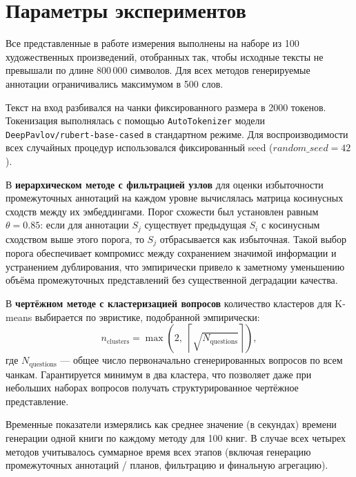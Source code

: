 \documentclass{article}
\theoremstyle{definition}
\theoremstyle{plain}
\begin{document}
\section*{Параметры экспериментов}

Все представленные в работе измерения выполнены на наборе из 100 художественных произведений, 
отобранных так, чтобы исходные тексты не превышали по длине 800\,000 символов. 
Для всех методов генерируемые аннотации ограничивались максимумом в 500 слов.

Текст на вход разбивался на чанки фиксированного размера в 2000 токенов. 
Токенизация выполнялась с помощью \texttt{AutoTokenizer} модели \texttt{DeepPavlov/rubert-base-cased} в стандартном режиме.
Для воспроизводимости всех случайных процедур использовался фиксированный seed ($random\_seed = 42$).

В \textbf{иерархическом методе с фильтрацией узлов} для оценки избыточности промежуточных аннотаций на каждом уровне вычислялась матрица косинусных сходств между их эмбеддингами.
Порог схожести был установлен равным $\theta=0.85$: если для аннотации $S_j$ существует предыдущая $S_i$ с косинусным сходством выше этого порога, 
то $S_j$ отбрасывается как избыточная. Такой выбор порога обеспечивает компромисс между сохранением значимой информации и устранением дублирования, 
что эмпирически привело к заметному уменьшению объёма промежуточных представлений без существенной деградации качества.

В \textbf{чертёжном методе с кластеризацией вопросов} количество кластеров для K-means выбирается по эвристике, подобранной эмпирически:
\[
n_{\text{clusters}} = \max\!\left(2,\; \left\lceil \sqrt{N_{\text{questions}}} \right\rceil\right),
\]
где $N_{\text{questions}}$ — общее число первоначально сгенерированных вопросов по всем чанкам. 
Гарантируется минимум в два кластера, что позволяет даже при небольших наборах вопросов получать структурированное чертёжное представление.

Временные показатели измерялись как среднее значение (в секундах) времени генерации одной книги по каждому методу для 100 книг. 
В случае всех четырех методов учитывалось суммарное время всех этапов (включая генерацию промежуточных аннотаций / планов, фильтрацию и финальную агрегацию).
\end{document}
